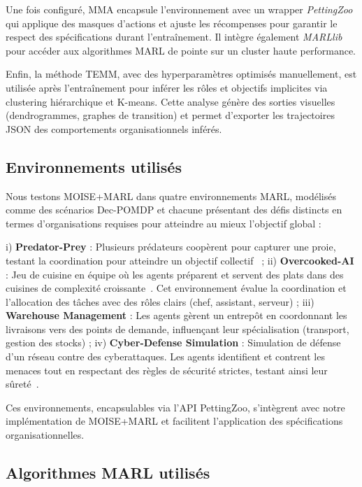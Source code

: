 \documentclass[francais,ROIA,Unicode,manuscript]{cedram}
\begin{document}
Une fois configuré, MMA encapsule l'environnement avec un wrapper \textit{PettingZoo} qui applique des masques d'actions et ajuste les récompenses pour garantir le respect des spécifications durant l'entraînement. Il intègre également \textit{MARLlib}~\cite{hu2021marlib} pour accéder aux algorithmes MARL de pointe sur un cluster haute performance.

Enfin, la méthode TEMM, avec des hyperparamètres optimisés manuellement, est utilisée après l'entraînement pour inférer les rôles et objectifs implicites via clustering hiérarchique et K-means. Cette analyse génère des sorties visuelles (dendrogrammes, graphes de transition) et permet d'exporter les trajectoires JSON des comportements organisationnels inférés.

\subsection{Environnements utilisés}

Nous testons MOISE+MARL dans quatre environnements MARL, modélisés comme des scénarios Dec-POMDP et chacune présentant des défis distincts en termes d'organisations requises pour atteindre au mieux l'objectif global :

i) \textbf{Predator-Prey} : Plusieurs prédateurs coopèrent pour capturer une proie, testant la coordination pour atteindre un objectif collectif~\cite{lowe2017multi}
; \quad
ii) \textbf{Overcooked-AI} : Jeu de cuisine en équipe où les agents préparent et servent des plats dans des cuisines de complexité croissante~\cite{overcookedai}. Cet environnement évalue la coordination et l'allocation des tâches avec des rôles clairs (chef, assistant, serveur)
; \quad
iii) \textbf{Warehouse Management} : Les agents gèrent un entrepôt en coordonnant les livraisons vers des points de demande, influençant leur spécialisation (transport, gestion des stocks)
; \quad
iv) \textbf{Cyber-Defense Simulation} : Simulation de défense d'un réseau contre des cyberattaques. Les agents identifient et contrent les menaces tout en respectant des règles de sécurité strictes, testant ainsi leur sûreté~\cite{Maxwell2021}.

Ces environnements, encapsulables via l'API PettingZoo, s'intègrent avec notre implémentation de MOISE+MARL et facilitent l'application des spécifications organisationnelles.

\subsection{Algorithmes MARL utilisés}
\end{document}

